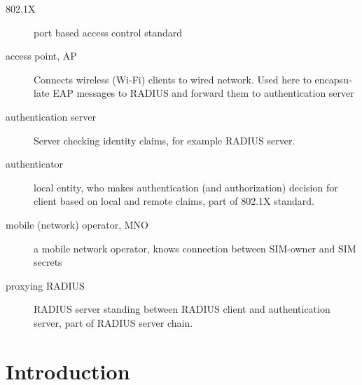 \documentclass[12pt,a4paper,english]{tutthesis}
\begin{document}
\begin{otherlanguage}{english}
\newpage

\begin{description}
\item[{802.1X}] port based access control standard
\item[{access point, AP}] Connects wireless (Wi-Fi) clients to wired network.
Used here to encapsulate EAP messages to RADIUS and
forward them to authentication server
\end{description}
\begin{description}
\item[{authentication server}] Server checking identity claims, for
example RADIUS server.
\item[{authenticator}] local entity, who makes authentication (and
authorization) decision for client based on local and remote
claims, part of 802.1X standard.
\end{description}
\begin{description}
\item[{mobile (network) operator, MNO}] a mobile network operator, knows connection
between SIM-owner and SIM secrets
\end{description}
\begin{description}
\item[{proxying RADIUS}] RADIUS server standing between RADIUS
client and authentication server, part of RADIUS server chain.
\end{description}



\if@twoside
\cleardoublepage
\fi

\newpage             %
\setcounter{page}{1} %
\renewcommand{\chaptername}{} %

\chapter{Introduction}
\label{sec-1}
\label{cha:intro}



\end{otherlanguage}
\end{document}
